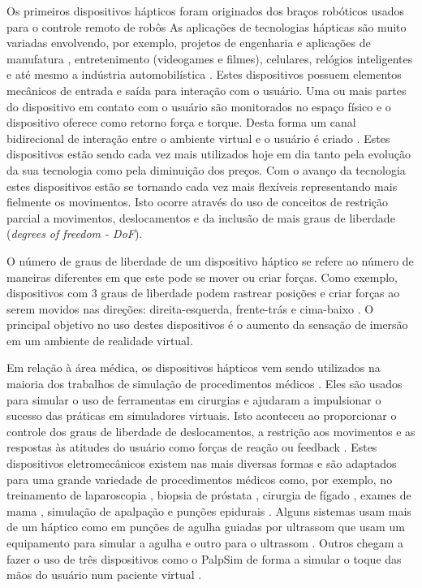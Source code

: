 Os primeiros dispositivos hápticos foram originados dos braços robóticos usados para o controle remoto de robôs \cite{Zurawski2005} As aplicações de tecnologias hápticas são muito variadas envolvendo, por exemplo, projetos de engenharia e aplicações de manufatura \cite{Sharma2001}, entretenimento (videogames e filmes), celulares, relógios inteligentes e até mesmo a indústria automobilística \cite{Smith2019}. Estes dispositivos possuem elementos mecânicos de entrada e saída para interação com o usuário. Uma ou mais partes do dispositivo em contato com o usuário são monitorados no espaço físico e o dispositivo oferece como retorno força e torque. Desta forma um canal bidirecional de interação entre o ambiente virtual e o usuário é criado \cite{Coles2011}. Estes dispositivos estão sendo cada vez mais utilizados hoje em dia tanto pela evolução da sua tecnologia como pela diminuição dos preços. Com o avanço da tecnologia estes dispositivos estão se tornando cada vez mais flexíveis representando mais fielmente os movimentos. Isto ocorre  através do uso de conceitos de restrição parcial a movimentos, deslocamentos e da inclusão de mais graus de liberdade (\textit{degrees of freedom - DoF}). 

O número de graus de liberdade de um dispositivo háptico se refere ao número de maneiras diferentes em que este pode se mover ou criar forças. Como exemplo, dispositivos com 3 graus de liberdade podem rastrear posições e criar forças ao serem movidos nas direções: direita-esquerda, frente-trás e cima-baixo \cite{HAPTICSHOUSE2019}. O principal objetivo no uso destes dispositivos é o aumento da sensação de imersão em um ambiente de realidade virtual. 

Em relação à área médica, os dispositivos hápticos vem sendo utilizados na maioria dos trabalhos de simulação de procedimentos médicos \cite{Coles2011,Escobar-Castillejos2016}. Eles são usados para simular o uso de ferramentas em cirurgias e ajudaram a impulsionar o sucesso das práticas em simuladores virtuais. Isto aconteceu ao proporcionar o controle dos graus de liberdade de deslocamentos, a restrição aos movimentos e as respostas às atitudes do usuário como forças de reação ou feedback \cite{Gerovich2004}. Estes dispositivos eletromecânicos existem nas mais diversas formas e são adaptados para uma grande variedade de procedimentos médicos como, por exemplo, no treinamento de laparoscopia \cite{Srinivasan2004}, biopsia de próstata \cite{Sclaverano2009}, cirurgia de fígado \cite{Mastmeyer2016}, exames de mama \cite{Brazil2017,Jeon2010,Ribeiro2014,Solanki2010}, simulação de apalpação \cite{Ribeiro2016} e punções epidurais \cite{N.2013, Brazil2018}. Alguns sistemas usam mais de um háptico como em punções de agulha guiadas por ultrassom que usam um equipamento para simular a agulha e outro para o ultrassom \cite{Ni2011,Vidal2008}. Outros chegam a fazer o uso de três dispositivos como o PalpSim de forma a simular o toque das mãos do usuário num paciente virtual \cite{Coles2011b}. 


